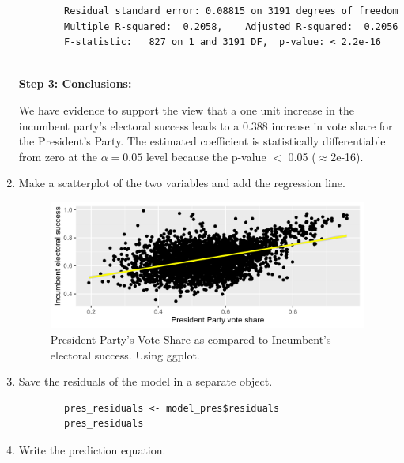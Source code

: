 \documentclass[12pt,letterpaper]{article}
\begin{document}
\begin{enumerate}
\begin{verbatim}
		Residual standard error: 0.08815 on 3191 degrees of freedom
		Multiple R-squared:  0.2058,	Adjusted R-squared:  0.2056 
		F-statistic:   827 on 1 and 3191 DF,  p-value: < 2.2e-16
		
	\end{verbatim}
	
	\textbf{Step 3: Conclusions:}
	
	We have evidence to support the view that a one unit increase in the incumbent party's electoral success leads to a 0.388 increase in vote share for the President's Party. The estimated coefficient is statistically differentiable from zero at the $\alpha=0.05$ level because the p-value $<$ 0.05 ($\approx $2e-16). \\
	
	
	\item Make a scatterplot of the two variables and add the regression line. 	
	
	  
	
	\begin{figure}[h!]
		\centering
		\caption{\footnotesize President Party's Vote Share as compared to Incumbent's electoral success. Using ggplot.}
		\includegraphics[width=0.99\textwidth]{vote_share2_scatter.png}
		
	\end{figure} 
	
	\newpage
	
	\item Save the residuals of the model in a separate object.	
	
	\begin{verbatim}
		pres_residuals <- model_pres$residuals
		pres_residuals
	\end{verbatim}
	
	
	\item Write the prediction equation.
	
\end{enumerate}		
\end{document}
